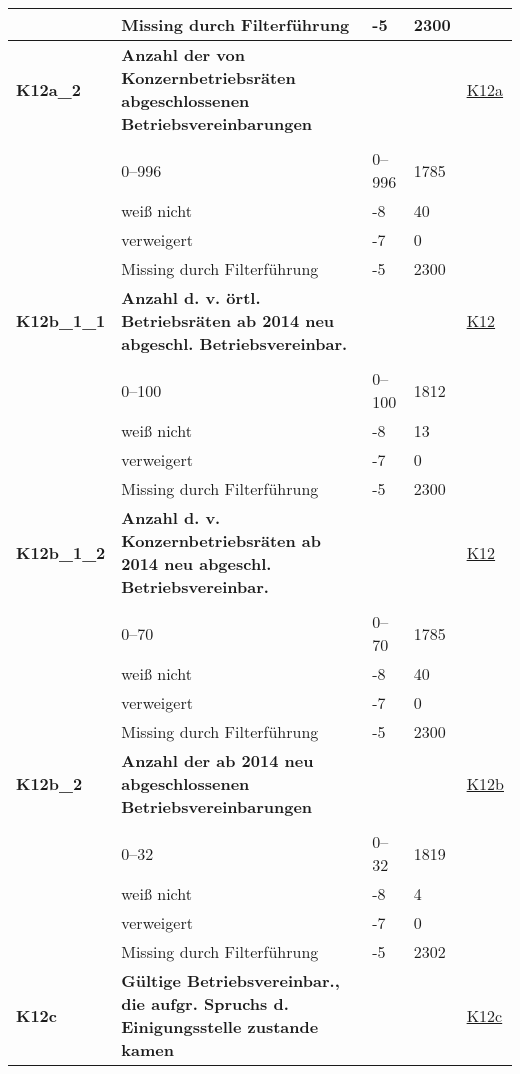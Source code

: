 \begin{longtable}{| L{2.5cm} | L{8.25cm}| C{1.5cm} | R{1.25cm} | C{2.25cm} |  }
   & Missing durch Filterführung & -5 & 2300 &  \\ 
   \midrule
\textbf{K12a\_2}\label{var:suf:K12a:2} & \textbf{Anzahl der von Konzernbetriebsräten abgeschlossenen Betriebsvereinbarungen} &  &  & \hyperref[K12a]{K12a} \\ 
   &  &  &  &  \\ 
   & 0--996 & 0--996 & 1785 &  \\ 
   & weiß nicht & -8 & 40 &  \\ 
   & verweigert & -7 & 0 &  \\ 
   & Missing durch Filterführung & -5 & 2300 &  \\ 
   \midrule
\textbf{K12b\_1\_1}\label{var:suf:K12b:1:1} & \textbf{Anzahl d. v. örtl. Betriebsräten ab 2014 neu abgeschl. Betriebsvereinbar.} &  &  & \hyperref[K12]{K12} \\ 
   &  &  &  &  \\ 
   & 0--100 & 0--100 & 1812 &  \\ 
   & weiß nicht & -8 & 13 &  \\ 
   & verweigert & -7 & 0 &  \\ 
   & Missing durch Filterführung & -5 & 2300 &  \\ 
   \midrule
\textbf{K12b\_1\_2}\label{var:suf:K12b:1:2} & \textbf{Anzahl d. v. Konzernbetriebsräten ab 2014 neu abgeschl. Betriebsvereinbar.} &  &  & \hyperref[K12]{K12} \\ 
   &  &  &  &  \\ 
   & 0--70 & 0--70 & 1785 &  \\ 
   & weiß nicht & -8 & 40 &  \\ 
   & verweigert & -7 & 0 &  \\ 
   & Missing durch Filterführung & -5 & 2300 &  \\ 
   \midrule
\textbf{K12b\_2}\label{var:suf:K12b:2} & \textbf{Anzahl der ab 2014 neu abgeschlossenen Betriebsvereinbarungen} &  &  & \hyperref[K12b]{K12b} \\ 
   &  &  &  &  \\ 
   & 0--32 & 0--32 & 1819 &  \\ 
   & weiß nicht & -8 & 4 &  \\ 
   & verweigert & -7 & 0 &  \\ 
   & Missing durch Filterführung & -5 & 2302 &  \\ 
   \midrule
\textbf{K12c}\label{var:suf:K12c} & \textbf{Gültige Betriebsvereinbar., die aufgr. Spruchs d. Einigungsstelle zustande kamen} &  &  & \hyperref[K12c]{K12c} \\ 

\end{longtable}
